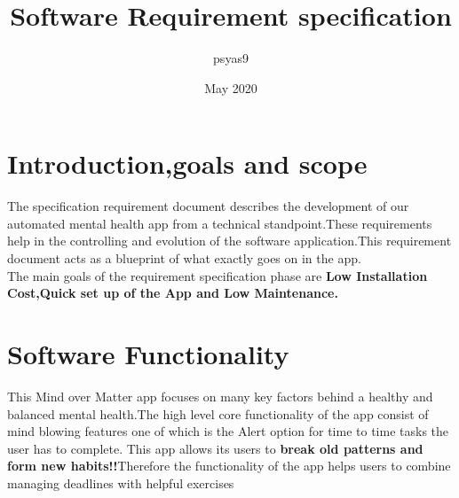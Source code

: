 \documentclass{article}
\title{Software Requirement specification}
\author{psyas9 }
\date{May 2020}
\begin{document}
\maketitle

\tableofcontents
\newpage

\section{Introduction,goals and scope}
The specification requirement document describes the development of our automated mental health app from a technical standpoint.These requirements help in the controlling and evolution of the software application.This requirement document acts as a blueprint of what exactly goes on in the app.\\
The main goals of the requirement specification phase are \textbf{Low Installation Cost,Quick set up of the App and Low Maintenance. }\\


\section{Software Functionality}
This Mind over Matter app focuses on many key factors behind a healthy and balanced mental health.The high level core functionality of the app consist of mind blowing features one of which is the Alert option for time to time tasks the user has to complete. This app allows its users to \textbf{break old patterns and form new habits!!}Therefore the functionality of the app helps users to combine managing deadlines with helpful exercises
\end{document}
